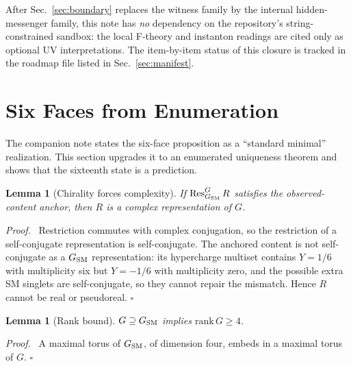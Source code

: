 \documentclass[
  aps,
  prd,
  preprint,
  nofootinbib,
  superscriptaddress,
  longbibliography
]{revtex4-2}
\DeclareMathOperator{\Res}{Res}
\newtheorem{lemma}[theorem]{Lemma}
\newenvironment{proof}{\par\noindent\textit{Proof.}\ }{\hfill\(\square\)\par}
\begin{document}
After Sec.~\ref{sec:boundary} replaces the witness family by the internal
hidden-messenger family, this note has \emph{no} dependency on the
repository's string-constrained sandbox: the local F-theory and instanton
readings are cited only as optional UV interpretations.  The item-by-item
status of this closure is tracked in the roadmap file listed in
Sec.~\ref{sec:manifest}.

\section{Six Faces from Enumeration}
\label{sec:sixface}

The companion note states the six-face proposition as a ``standard
minimal'' realization.  This section upgrades it to an enumerated
uniqueness theorem and shows that the sixteenth state is a prediction.

\begin{lemma}[Chirality forces complexity]
\label{lem:complex}
If \(\Res^G_{G_{\rm SM}}R\) satisfies the observed-content anchor, then
\(R\) is a complex representation of \(G\).
\end{lemma}

\begin{proof}
Restriction commutes with complex conjugation, so the restriction of a
self-conjugate representation is self-conjugate.  The anchored content is
not self-conjugate as a \(G_{\rm SM}\) representation: its hypercharge
multiset contains \(Y=1/6\) with multiplicity six but \(Y=-1/6\) with
multiplicity zero, and the possible extra SM singlets are self-conjugate,
so they cannot repair the mismatch.  Hence \(R\) cannot be real or
pseudoreal.
\end{proof}

\begin{lemma}[Rank bound]
\label{lem:rank}
\(G\supseteq G_{\rm SM}\) implies \(\mathrm{rank}\,G\ge4\).
\end{lemma}

\begin{proof}
A maximal torus of \(G_{\rm SM}\), of dimension four, embeds in a maximal
torus of \(G\).
\end{proof}
\end{document}
